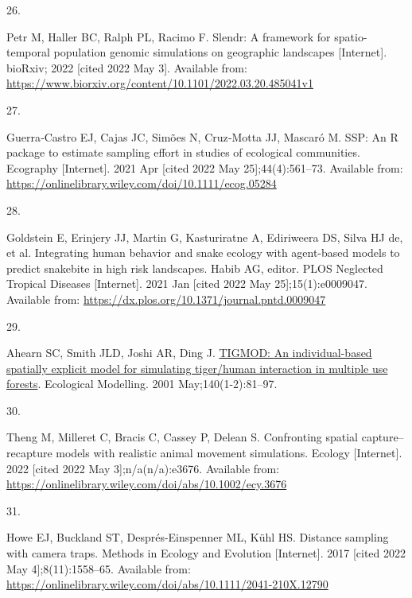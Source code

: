\documentclass[10pt,a4paper]{article}
\newlength{\cslhangindent}
\newlength{\csllabelwidth}
\newlength{\cslentryspacingunit} %
\newenvironment{CSLReferences}[2] %
 {%
  \setlength{\parindent}{0pt}
  \ifodd #1
  \let\oldpar\par
  \def\par{\hangindent=\cslhangindent\oldpar}
  \fi
  \setlength{\parskip}{#2\cslentryspacingunit}
 }%
 {}
\newcommand{\CSLLeftMargin}[1]{\parbox[t]{\csllabelwidth}{#1}}
\newcommand{\CSLRightInline}[1]{\parbox[t]{\linewidth - \csllabelwidth}{#1}\break}
\begin{document}
\begin{CSLReferences}{0}{0}
\leavevmode{}%
\CSLLeftMargin{26. }
\CSLRightInline{Petr M, Haller BC, Ralph PL, Racimo F. Slendr: A framework for spatio-temporal population genomic simulations on geographic landscapes {[}Internet{]}. bioRxiv; 2022 {[}cited 2022 May 3{]}. Available from: \url{https://www.biorxiv.org/content/10.1101/2022.03.20.485041v1}}

\leavevmode{}%
\CSLLeftMargin{27. }
\CSLRightInline{Guerra‐Castro EJ, Cajas JC, Simões N, Cruz‐Motta JJ, Mascaró M. {SSP}: An {R} package to estimate sampling effort in studies of ecological communities. Ecography {[}Internet{]}. 2021 Apr {[}cited 2022 May 25{]};44(4):561--73. Available from: \url{https://onlinelibrary.wiley.com/doi/10.1111/ecog.05284}}

\leavevmode{}%
\CSLLeftMargin{28. }
\CSLRightInline{Goldstein E, Erinjery JJ, Martin G, Kasturiratne A, Ediriweera DS, Silva HJ de, et al. Integrating human behavior and snake ecology with agent-based models to predict snakebite in high risk landscapes. Habib AG, editor. PLOS Neglected Tropical Diseases {[}Internet{]}. 2021 Jan {[}cited 2022 May 25{]};15(1):e0009047. Available from: \url{https://dx.plos.org/10.1371/journal.pntd.0009047}}

\leavevmode{}%
\CSLLeftMargin{29. }
\CSLRightInline{Ahearn SC, Smith JLD, Joshi AR, Ding J. \href{https://doi.org/10.1016/S0304-3800(01)00258-7}{{TIGMOD}: {An} individual-based spatially explicit model for simulating tiger/human interaction in multiple use forests}. Ecological Modelling. 2001 May;140(1-2):81--97. }

\leavevmode{}%
\CSLLeftMargin{30. }
\CSLRightInline{Theng M, Milleret C, Bracis C, Cassey P, Delean S. Confronting spatial capture--recapture models with realistic animal movement simulations. Ecology {[}Internet{]}. 2022 {[}cited 2022 May 3{]};n/a(n/a):e3676. Available from: \url{https://onlinelibrary.wiley.com/doi/abs/10.1002/ecy.3676}}

\leavevmode{}%
\CSLLeftMargin{31. }
\CSLRightInline{Howe EJ, Buckland ST, Després-Einspenner ML, Kühl HS. Distance sampling with camera traps. Methods in Ecology and Evolution {[}Internet{]}. 2017 {[}cited 2022 May 4{]};8(11):1558--65. Available from: \url{https://onlinelibrary.wiley.com/doi/abs/10.1111/2041-210X.12790}}


\end{CSLReferences}
\end{document}
